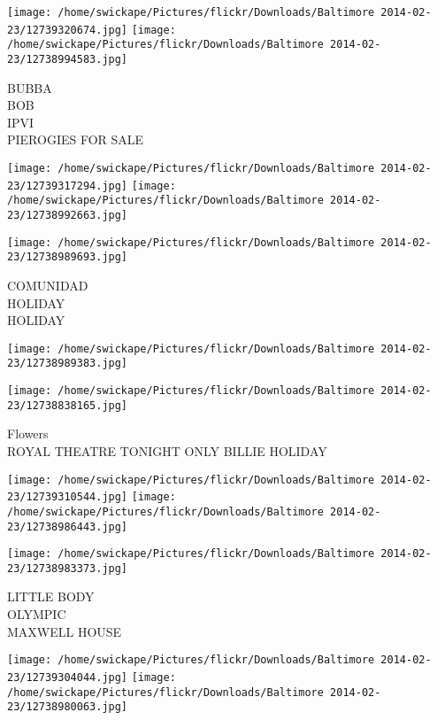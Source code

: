 \documentclass[10pt,letterpaper]{article}
\begin{document}
\texttt{[image: /home/swickape/Pictures/flickr/Downloads/Baltimore 2014-02-23/12739320674.jpg]}
\texttt{[image: /home/swickape/Pictures/flickr/Downloads/Baltimore 2014-02-23/12738994583.jpg]}

BUBBA\\
BOB\\
IPVI\\
PIEROGIES FOR SALE\\
\pagebreak

\texttt{[image: /home/swickape/Pictures/flickr/Downloads/Baltimore 2014-02-23/12739317294.jpg]}
\texttt{[image: /home/swickape/Pictures/flickr/Downloads/Baltimore 2014-02-23/12738992663.jpg]}

\texttt{[image: /home/swickape/Pictures/flickr/Downloads/Baltimore 2014-02-23/12738989693.jpg]}

COMUNIDAD\\
HOLIDAY\\
HOLIDAY\\
\pagebreak

\texttt{[image: /home/swickape/Pictures/flickr/Downloads/Baltimore 2014-02-23/12738989383.jpg]}

\vspace{0.25in}
\texttt{[image: /home/swickape/Pictures/flickr/Downloads/Baltimore 2014-02-23/12738838165.jpg]}

Flowers\\
ROYAL THEATRE TONIGHT ONLY BILLIE HOLIDAY\\
\pagebreak

\texttt{[image: /home/swickape/Pictures/flickr/Downloads/Baltimore 2014-02-23/12739310544.jpg]}
\texttt{[image: /home/swickape/Pictures/flickr/Downloads/Baltimore 2014-02-23/12738986443.jpg]}

\vspace{0.25in}
\texttt{[image: /home/swickape/Pictures/flickr/Downloads/Baltimore 2014-02-23/12738983373.jpg]}

LITTLE BODY\\
OLYMPIC\\
MAXWELL HOUSE\\
\pagebreak

\texttt{[image: /home/swickape/Pictures/flickr/Downloads/Baltimore 2014-02-23/12739304044.jpg]}
\texttt{[image: /home/swickape/Pictures/flickr/Downloads/Baltimore 2014-02-23/12738980063.jpg]}
\end{document}
